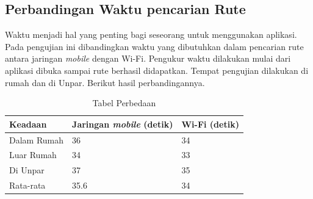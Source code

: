 	
	
	

	
\subsection{Perbandingan Waktu pencarian Rute}
\label{lab:PerbandinganWaktu}
\hspace{0.5cm} Waktu menjadi hal yang penting bagi seseorang untuk menggunakan aplikasi. Pada pengujian ini dibandingkan waktu yang dibutuhkan dalam pencarian rute antara jaringan \textit{mobile} dengan Wi-Fi. Pengukur waktu dilakukan mulai dari aplikasi dibuka sampai rute berhasil didapatkan. Tempat pengujian dilakukan di rumah dan di Unpar. Berikut hasil perbandingannya.
   \begin{table}[h]
	\centering
		\begin{tabular}{|p{4cm}|p{4cm}|p{4cm}|}\hline
				Keadaan & Jaringan \textit{mobile} (detik) & Wi-Fi (detik) \\ \hline
				Dalam Rumah & 36 & 34\\ \hline
				Luar Rumah & 34 & 33\\ \hline
				Di Unpar & 37 & 35\\ \hline
				Rata-rata & 35.6 & 34\\ \hline
		\end{tabular}
	\caption{Tabel Perbedaan}
	\label{tab:TabelPerbandinganWifiSelular}
\end{table}

